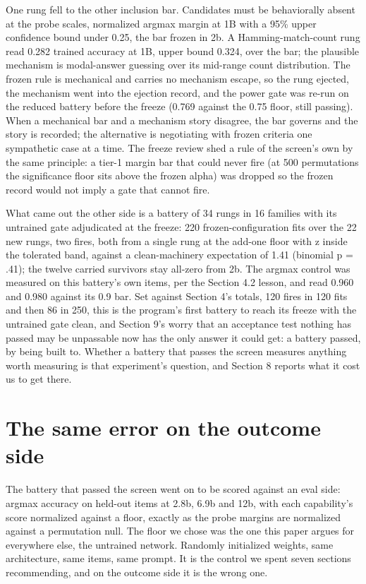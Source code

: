 One rung fell to the other inclusion bar. Candidates must be
behaviorally absent at the probe scales, normalized argmax margin at
1B with a 95\% upper confidence bound under 0.25, the bar frozen in
2b. A Hamming-match-count rung read 0.282 trained accuracy at 1B,
upper bound 0.324, over the bar; the plausible mechanism is
modal-answer guessing over its mid-range count distribution. The
frozen rule is mechanical and carries no mechanism escape, so the
rung ejected, the mechanism went into the ejection record, and the
power gate was re-run on the reduced battery before the freeze (0.769
against the 0.75 floor, still passing). When a mechanical bar and a
mechanism story disagree, the bar governs and the story is recorded;
the alternative is negotiating with frozen criteria one sympathetic
case at a time. The freeze review shed a rule of the screen's own by
the same principle: a tier-1 margin bar that could never fire (at 500
permutations the significance floor sits above the frozen alpha) was
dropped so the frozen record would not imply a gate that cannot fire.

What came out the other side is a battery of 34 rungs in 16 families
with its untrained gate adjudicated at the freeze: 220
frozen-configuration fits over the 22 new rungs, two fires, both from
a single rung at the add-one floor with z inside the tolerated band,
against a clean-machinery expectation of 1.41 (binomial p = .41); the
twelve carried survivors stay all-zero from 2b. The argmax control
was measured on this battery's own items, per the Section 4.2 lesson,
and read 0.960 and 0.980 against its 0.9 bar. Set against Section 4's
totals, 120 fires in 120 fits and then 86 in 250, this is the
program's first battery to reach its freeze with the untrained gate
clean, and Section 9's worry that an acceptance test nothing has
passed may be unpassable now has the only answer it could get: a
battery passed, by being built to. Whether a battery that passes the
screen measures anything worth measuring is that experiment's
question, and Section 8 reports what it cost us to get there.

\section{The same error on the outcome side}\label{the-same-error-on-the-outcome-side}

The battery that passed the screen went on to be scored against an
eval side: argmax accuracy on held-out items at 2.8b, 6.9b and 12b,
with each capability's score normalized against a floor, exactly as
the probe margins are normalized against a permutation null. The floor
we chose was the one this paper argues for everywhere else, the
untrained network. Randomly initialized weights, same architecture,
same items, same prompt. It is the control we spent seven sections
recommending, and on the outcome side it is the wrong one.

